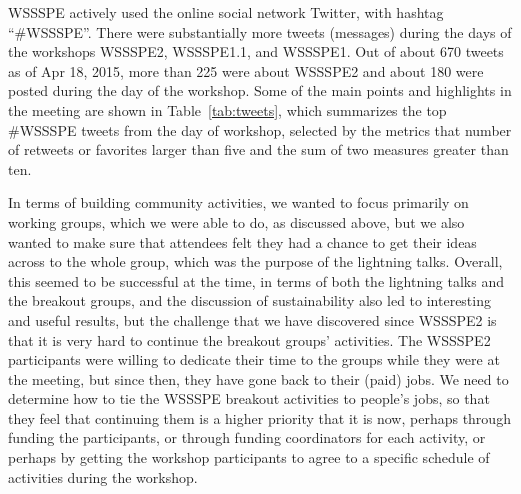 \documentclass[11pt, oneside]{amsart}
\begin{document}
WSSSPE actively used the online social network Twitter, with hashtag
``\#WSSSPE''. There were substantially more tweets (messages) during the days of
the workshops WSSSPE2, WSSSPE1.1, and WSSSPE1. Out of about 670 tweets as of Apr
18, 2015, more than 225 were about WSSSPE2 and about 180 were posted during the
day of the workshop. Some of the main points and highlights in the meeting are
shown in Table~\ref{tab:tweets}, which summarizes the top \#WSSSPE tweets from
the day of workshop, selected by the metrics that number of retweets or
favorites larger than five and the sum of two measures greater than ten.

In terms of building community activities, we wanted to focus primarily on
working groups, which we were able to do, as discussed above, but we
also wanted to make sure that attendees felt they had a chance to get their
ideas across to the whole group, which was the purpose of the lightning talks.
Overall, this seemed to be successful at the time, in terms of both the lightning
talks and the breakout groups, and the discussion of sustainability also led
to interesting and useful results, but the challenge that we have discovered
since WSSSPE2 is that it is very hard to continue the breakout groups'
activities.  The WSSSPE2 participants were willing to dedicate their time to
the groups while they were at the meeting, but since then, they have gone
back to their (paid) jobs.  We need to determine how to tie the WSSSPE
breakout activities to people's jobs, so that they feel that continuing them
is a higher priority that it is now, perhaps through funding the participants,
or through funding coordinators for each activity, or perhaps by getting
the workshop participants to agree to a specific schedule of activities during the
workshop.
\end{document}
